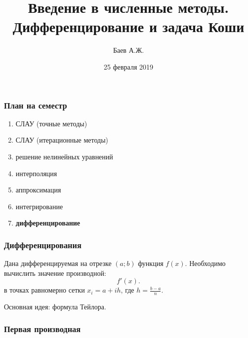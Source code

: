 \documentclass[10pt]{beamer}
\author{Баев А.Ж.}
\title{Введение в численные методы. \\ Дифференцирование и задача Коши}
\institute{Казахстанский филиал МГУ}
\date{25 февраля 2019}
\begin{document}
\maketitle


\begin{frame}[fragile]
\frametitle{План на семестр}

\begin{enumerate}
\item СЛАУ (точные методы)
\item СЛАУ (итерационные методы)
\item решение нелинейных уравнений
\item интерполяция
\item аппроксимация
\item интегрирование
\item \textbf{дифференцирование}
\end{enumerate}

\end{frame}


\begin{frame}[fragile]
\frametitle{Дифференцирования}

Дана дифференцируемая на отрезке $(a; b)$ функция $f(x)$. Необходимо вычислить значение производной:
$$f'(x).$$
в точках равномерно сетки $x_i = a + i h$, где $h = \frac{b-a}{n}$.

Основная идея: формула Тейлора.


\end{frame}

\begin{frame}[fragile]
\frametitle{Первая производная}

\begin{center}
\end{center}
\end{frame}
\end{document}
